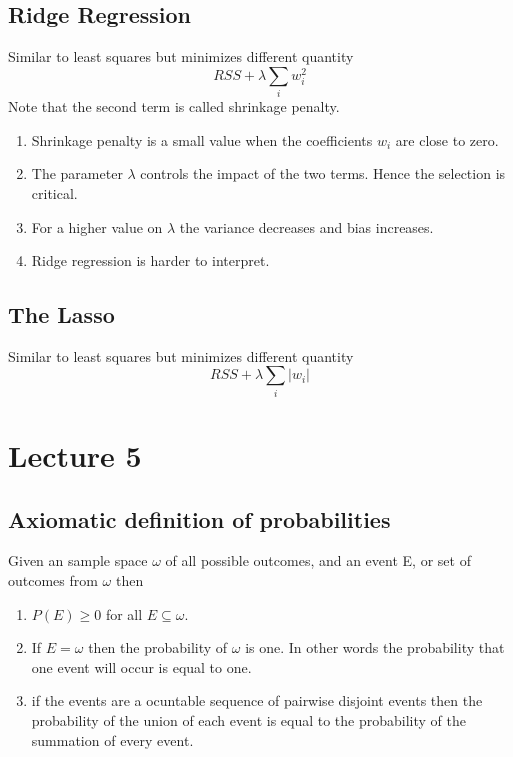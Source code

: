 \documentclass[12pt]{article}
\numberwithin{equation}{section}
\begin{document}
\subsection{Ridge Regression}
Similar to least squares but minimizes different quantity
\begin{equation}
RSS + \lambda \sum_i w_i^2
\end{equation}
Note that the second term is called shrinkage penalty.
\begin{enumerate}
    \item Shrinkage penalty is a small value when the coefficients $w_i$ are close to zero.
    \item The parameter $\lambda$ controls the impact of the two terms. Hence the selection is critical.
    \item For a higher value on $\lambda$ the variance decreases and bias increases.
    \item Ridge regression is harder to interpret.
\end{enumerate}

\subsection{The Lasso}
Similar to least squares but minimizes different quantity
\begin{equation}
RSS + \lambda \sum_i |w_i|
\end{equation}

\section{Lecture 5}

\subsection{Axiomatic definition of probabilities}
Given an sample space $\omega$ of all possible outcomes, and an event E, or set of outcomes from $\omega$ then
\begin{enumerate}
    \item $P(E) \geq 0$ for all $E \subseteq \omega$.
    \item If $E = \omega$ then the probability of $\omega$ is one. In other words the probability that one event will occur is equal to one.
    \item if the events are a ocuntable sequence of pairwise disjoint events then the probability of the union of each event is equal to the probability of the summation of every event.
\end{enumerate}
\end{document}
